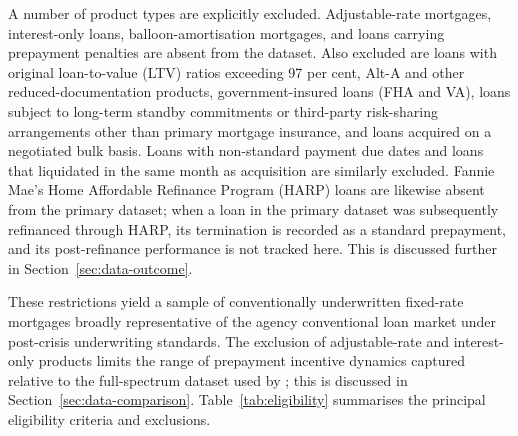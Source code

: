 A number of product types are explicitly excluded.  Adjustable-rate
mortgages, interest-only loans, balloon-amortisation mortgages, and
loans carrying prepayment penalties are absent from the dataset.
Also excluded are loans with original loan-to-value (LTV) ratios
exceeding 97 per cent, Alt-A and other reduced-documentation
products, government-insured loans (FHA and VA), loans subject to
long-term standby commitments or third-party risk-sharing
arrangements other than primary mortgage insurance, and loans
acquired on a negotiated bulk basis.  Loans with non-standard payment
due dates and loans that liquidated in the same month as acquisition
are similarly excluded.  Fannie Mae's Home Affordable Refinance
Program (HARP) loans are likewise absent from the primary dataset;
when a loan in the primary dataset was subsequently refinanced through
HARP, its termination is recorded as a standard prepayment, and its
post-refinance performance is not tracked here.  This is discussed
further in Section~\ref{sec:data-outcome}.

These restrictions yield a sample of conventionally underwritten
fixed-rate mortgages broadly representative of the agency conventional
loan market under post-crisis underwriting standards.  The exclusion
of adjustable-rate and interest-only products limits the range of
prepayment incentive dynamics captured relative to the full-spectrum
dataset used by \citet{sirignano2021}; this is discussed in
Section~\ref{sec:data-comparison}.  Table~\ref{tab:eligibility}
summarises the principal eligibility criteria and exclusions.

